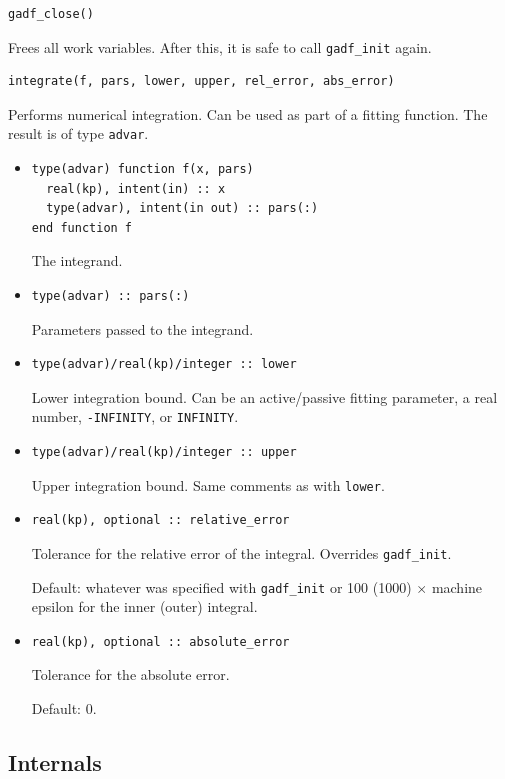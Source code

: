 \documentclass{article}
\begin{document}
\begin{verbatim}
gadf_close()
\end{verbatim}
Frees all work variables. After this, it is safe to call
\verb+gadf_init+ again.

\begin{verbatim}
integrate(f, pars, lower, upper, rel_error, abs_error)
\end{verbatim}
Performs numerical integration. Can be used as part of a fitting function. The result is of type \verb+advar+.
\begin{itemize}
\item
\begin{verbatim}
type(advar) function f(x, pars)
  real(kp), intent(in) :: x
  type(advar), intent(in out) :: pars(:)
end function f
\end{verbatim}
  The integrand.
\item
\begin{verbatim}
type(advar) :: pars(:)
\end{verbatim}
  Parameters passed to the integrand.
\item
\begin{verbatim}
type(advar)/real(kp)/integer :: lower
\end{verbatim}
  Lower integration bound. Can be an active/passive fitting parameter, a real number, \verb+-INFINITY+, or \verb+INFINITY+.
\item
\begin{verbatim}
type(advar)/real(kp)/integer :: upper
\end{verbatim}
  Upper integration bound. Same comments as with \verb+lower+.
\item
\begin{verbatim}
real(kp), optional :: relative_error
\end{verbatim}
  Tolerance for the relative error of the integral. Overrides \verb+gadf_init+.

  Default: whatever was specified with \verb+gadf_init+ or 100 (1000) $\times$ machine epsilon for the inner (outer) integral.
\item
\begin{verbatim}
real(kp), optional :: absolute_error
\end{verbatim}
  Tolerance for the absolute error.

  Default: 0.
\end{itemize}

\subsection{Internals}
\end{document}
